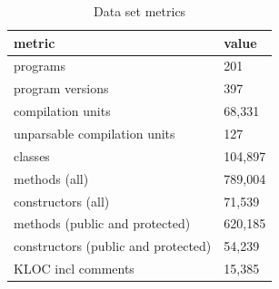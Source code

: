 \begin{table}[]
\centering
\caption{Data set metrics }
\label{tab:data-metrics}
\begin{tabular}{|l|l|} \hline
   metric & value  \\ \hline
   programs & 201  \\
   program versions & 397  \\
   compilation units & 68,331  \\
   unparsable compilation units & 127  \\
   \hline
   classes & 104,897  \\
   methods (all)& 789,004  \\
   constructors (all)& 71,539  \\
   methods (public and protected) & 620,185  \\
   constructors (public and protected) & 54,239  \\
   KLOC incl comments& 15,385  \\ \hline
\end{tabular}
\end{table}
